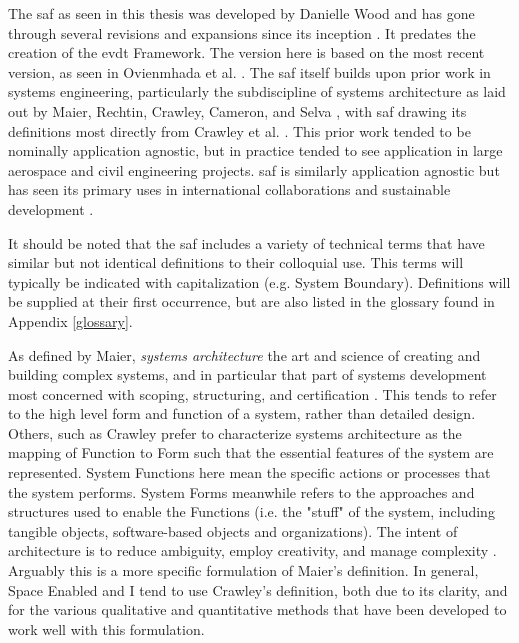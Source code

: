 The \ac{saf} as seen in this thesis was developed by Danielle Wood and has gone through several revisions and expansions since its inception \cite{woodAnalysisTechnologyTransfer2013, woodApplyingSystemsArchitecture2014, kazanskyCurrentPotentialRole2016}. It predates the creation of the \ac{evdt} Framework. The version here is based on the most recent version, as seen in Ovienmhada et al. \cite{ovienmhadaInclusiveDesignEarth2021}. The \ac{saf} itself builds upon prior work in systems engineering, particularly the subdiscipline of systems architecture as laid out by Maier, Rechtin, Crawley, Cameron, and Selva \cite{crawley2004, crawleySystemArchitectureStrategy2015, maierArtSystemsArchitecting2009}, with \ac{saf} drawing its definitions most directly from Crawley et al. \cite{crawley2004}. This prior work tended to be nominally application agnostic, but in practice tended to see application in large aerospace and civil engineering projects. \ac{saf} is similarly application agnostic but has seen its primary uses in international collaborations \cite{pfotenhauerArchitectingComplexInternational2016} and sustainable development \cite{ovienmhadaInclusiveDesignEarth2021}. 

It should be noted that the \ac{saf} includes a variety of technical terms that have similar but not identical definitions to their colloquial use. This terms will typically be indicated with capitalization (e.g. System Boundary). Definitions will be supplied at their first occurrence, but are also listed in the glossary found in Appendix \ref{glossary}.

As defined by Maier, \textit{systems architecture} the art and science of creating and building complex systems, and in particular that part of systems development most concerned with scoping, structuring, and certification \cite{maierArtSystemsArchitecting2009}. This tends to refer to the high level form and function of a system, rather than detailed design. Others, such as Crawley prefer to characterize systems architecture as the mapping of Function to Form such that the essential features of the system are represented. System Functions here mean the specific actions or processes that the system performs. System Forms meanwhile refers to the approaches and structures used to enable the Functions (i.e. the "stuff" of the system, including tangible objects, software-based objects and organizations). The intent of architecture is to reduce ambiguity, employ creativity, and manage complexity \cite{crawleySystemArchitectureStrategy2015}. Arguably this is a more specific formulation of Maier's definition. In general, Space Enabled and I tend to use Crawley's definition, both due to its clarity, and for the various qualitative and quantitative methods that have been developed to work well with this formulation. 

